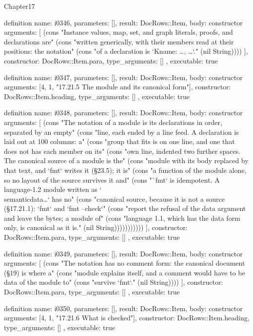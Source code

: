 \begin{lexlean}{Chapter17}
\begin{semanticmodule}
definition{
  name: i0346,
  parameters: [],
  result: DocRows::Item,
  body: constructor{
    arguments: [
      (cons "Instance values, map, set, and graph literals, proofs, and declarations are" (cons "written generically, with their members read at their positions: the notation" (cons "of a declaration is `K{name: …, …}`." (nil String))))
    ],
    constructor: DocRows::Item.para,
    type_arguments: []
  },
  executable: true
}

definition{
  name: i0347,
  parameters: [],
  result: DocRows::Item,
  body: constructor{
    arguments: [4, 1, "17.21.5 The module and its canonical form"],
    constructor: DocRows::Item.heading,
    type_arguments: []
  },
  executable: true
}

definition{
  name: i0348,
  parameters: [],
  result: DocRows::Item,
  body: constructor{
    arguments: [
      (cons "The notation of a module is its declarations in order, separated by an empty" (cons "line, each ended by a line feed. A declaration is laid out at 100 columns: a" (cons "group that fits is on one line, and one that does not has each member on its" (cons "own line, indented two further spaces. The canonical source of a module is the" (cons "module with its body replaced by that text, and `fmt` writes it (§23.5); it is" (cons "a function of the module alone, so no layout of the source survives it and" (cons "`fmt` is idempotent. A language-1.2 module written as `\\semanticdata{…}` has no" (cons "canonical source, because it is not a source (§17.21.1): `fmt` and `fmt --check`" (cons "report the refusal of the data argument and leave the bytes; a module of" (cons "language 1.1, which has the data form only, is canonical as it is." (nil String)))))))))))
    ],
    constructor: DocRows::Item.para,
    type_arguments: []
  },
  executable: true
}

definition{
  name: i0349,
  parameters: [],
  result: DocRows::Item,
  body: constructor{
    arguments: [
      (cons "The notation has no comment form: the canonical document (§19) is where a" (cons "module explains itself, and a comment would have to be data of the module to" (cons "survive `fmt`." (nil String))))
    ],
    constructor: DocRows::Item.para,
    type_arguments: []
  },
  executable: true
}

definition{
  name: i0350,
  parameters: [],
  result: DocRows::Item,
  body: constructor{
    arguments: [4, 1, "17.21.6 What is checked"],
    constructor: DocRows::Item.heading,
    type_arguments: []
  },
  executable: true
}


\end{semanticmodule}
\end{lexlean}
